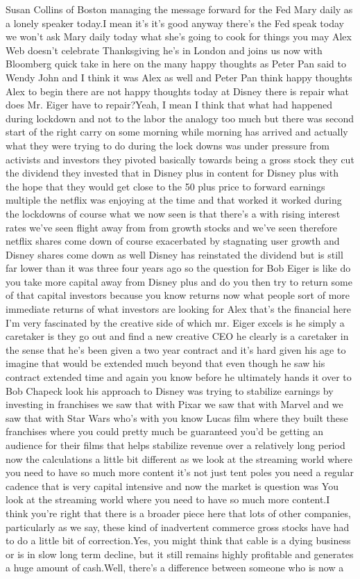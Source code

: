 \documentclass{article}%
\begin{document}
Susan Collins of Boston managing the message forward for the Fed Mary daily as a lonely speaker today.I mean it's it's good anyway there's the Fed speak today we won't ask Mary daily today what she's going to cook for things you may Alex Web doesn't celebrate Thanksgiving he's in London and joins us now with Bloomberg quick take in here on the many happy thoughts as Peter Pan said to Wendy John and I think it was Alex as well and Peter Pan think happy thoughts Alex to begin there are not happy thoughts today at Disney there is repair what does Mr. Eiger have to repair?Yeah, I mean I think that what had happened during lockdown and not to the labor the analogy too much but there was second start of the right carry on some morning while morning has arrived and actually what they were trying to do during the lock downs was under pressure from activists and investors they pivoted basically towards being a gross stock they cut the dividend they invested that in Disney plus in content for Disney plus with the hope that they would get close to the 50 plus price to forward earnings multiple the netflix was enjoying at the time and that worked it worked during the lockdowns of course what we now seen is that there's a with rising interest rates we've seen flight away from from growth stocks and we've seen therefore netflix shares come down of course exacerbated by stagnating user growth and Disney shares come down as well Disney has reinstated the dividend but is still far lower than it was three four years ago so the question for Bob Eiger is like do you take more capital away from Disney plus and do you then try to return some of that capital investors because you know returns now what people sort of more immediate returns of what investors are looking for Alex that's the financial here I'm very fascinated by the creative side of which mr. Eiger excels is he simply a caretaker is they go out and find a new creative CEO he clearly is a caretaker in the sense that he's been given a two year contract and it's hard given his age to imagine that would be extended much beyond that even though he saw his contract extended time and again you know before he ultimately hands it over to Bob Chapeck look his approach to Disney was trying to stabilize earnings by investing in franchises we saw that with Pixar we saw that with Marvel and we saw that with Star Wars who's with you know Lucas film where they built these franchises where you could pretty much be guaranteed you'd be getting an audience for their films that helps stabilize revenue over a relatively long period now the calculations a little bit different as we look at the streaming world where you need to have so much more content it's not just tent poles you need a regular cadence that is very capital intensive and now the market is question was  You look at the streaming world where you need to have so much more content.I think you're right that there is a broader piece here that lots of other companies, particularly as we say, these kind of inadvertent commerce gross stocks have had to do a little bit of correction.Yes, you might think that cable is a dying business or is in slow long term decline, but it still remains highly profitable and generates a huge amount of cash.Well, there's a difference between someone who is now a 
\end{document}
